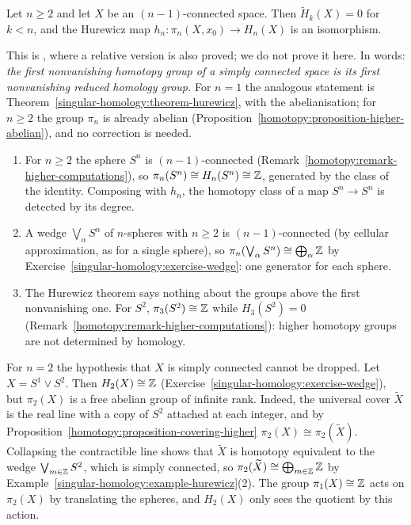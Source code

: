 \begin{theorem}[Hurewicz]\label{singular-homology:theorem-hurewicz-general}
Let $n \geq 2$ and let $X$ be an $(n-1)$-connected space. Then $\tilde{H}_k(X) = 0$ for $k < n$, and the Hurewicz map $h_n \colon \pi_n(X, x_0) \to H_n(X)$ is an isomorphism.
\end{theorem}

This is \cite[Theorem 4.32]{hatcher-at}, where a relative version is also proved; we do not prove it here. In words: \emph{the first nonvanishing homotopy group of a simply connected space
is its first nonvanishing reduced homology group.} For $n = 1$ the analogous statement is Theorem~\ref{singular-homology:theorem-hurewicz}, with the abelianisation; for $n \geq 2$ the group
$\pi_n$ is already abelian (Proposition~\ref{homotopy:proposition-higher-abelian}), and no correction is needed.

\begin{example}\label{singular-homology:example-hurewicz}
\begin{enumerate}
\item For $n \geq 2$ the sphere $S^n$ is $(n-1)$-connected (Remark~\ref{homotopy:remark-higher-computations}), so $\pi_n(S^n) \cong H_n(S^n) \cong \mathbb{Z}$, generated by the class of the
identity. Composing with $h_n$, the homotopy class of a map $S^n \to S^n$ is detected by its degree.
\item A wedge $\bigvee_{\alpha}S^n$ of $n$-spheres with $n \geq 2$ is $(n-1)$-connected (by cellular approximation, as for a single sphere), so
$\pi_n(\bigvee_\alpha S^n) \cong \bigoplus_\alpha\mathbb{Z}$ by Exercise~\ref{singular-homology:exercise-wedge}: one generator for each sphere.
\item The Hurewicz theorem says nothing about the groups above the first nonvanishing one. For $S^2$, $\pi_3(S^2) \cong \mathbb{Z}$ while $H_3(S^2) = 0$
(Remark~\ref{homotopy:remark-higher-computations}): higher homotopy groups are not determined by homology.
\end{enumerate}
\end{example}

\begin{counterexample}\label{singular-homology:counterexample-hurewicz-simply-connected}
For $n = 2$ the hypothesis that $X$ is simply connected cannot be dropped. Let $X = S^1 \vee S^2$. Then $H_2(X) \cong \mathbb{Z}$ (Exercise~\ref{singular-homology:exercise-wedge}), but $\pi_2(X)$ is a
free abelian group of infinite rank. Indeed, the universal cover $\widetilde{X}$ is the real line with a copy of $S^2$ attached at each integer, and by
Proposition~\ref{homotopy:proposition-covering-higher} $\pi_2(X) \cong \pi_2(\widetilde{X})$. Collapsing the contractible line shows that $\widetilde{X}$ is homotopy equivalent to the
wedge $\bigvee_{m \in \mathbb{Z}}S^2$, which is simply connected, so $\pi_2(\widetilde{X}) \cong \bigoplus_{m \in \mathbb{Z}}\mathbb{Z}$ by Example~\ref{singular-homology:example-hurewicz}(2). The group
$\pi_1(X) \cong \mathbb{Z}$ acts on $\pi_2(X)$ by translating the spheres, and $H_2(X)$ only sees the quotient by this action.
\end{counterexample}

